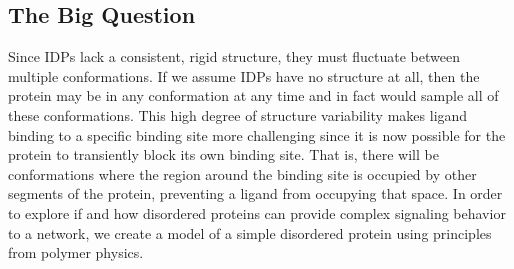 \documentclass[../AdvancementSummary.tex]{subfiles}
\begin{document}
\subsection{The Big Question}

Since IDPs lack a consistent, rigid structure, they must fluctuate between multiple conformations.  If we assume IDPs have no structure at all, then the protein may be in any conformation at any time and in fact would sample all of these conformations.  This high degree of structure variability makes ligand binding to a specific binding site more challenging since it is now possible for the protein to transiently block its own binding site. That is, there will be conformations where the region around the binding site is occupied by other segments of the protein, preventing a ligand from occupying that space. In order to explore if and how disordered proteins can provide complex signaling behavior to a network, we create a model of a simple disordered protein using principles from polymer physics.

\end{document}
